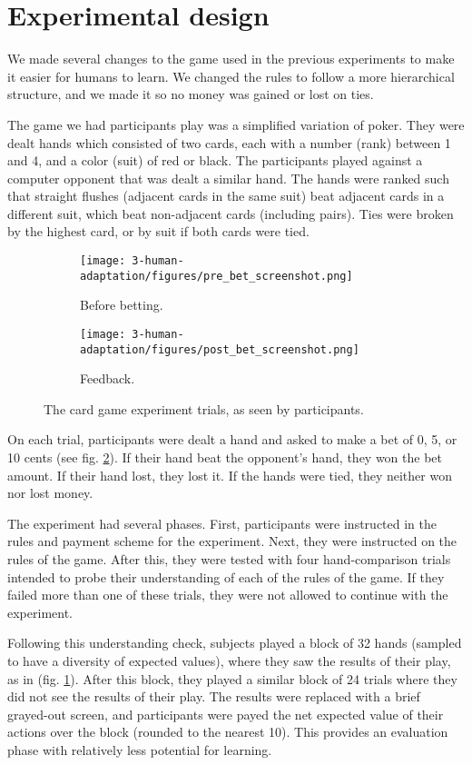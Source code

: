 \section{Experimental design}
We made several changes to the game used in the previous experiments to make it easier for humans to learn. We changed the rules to follow a more hierarchical structure, and we made it so no money was gained or lost on ties. \par
The game we had participants play was a simplified variation of poker. They were dealt hands which consisted of two cards, each with a number (rank) between 1 and 4, and a color (suit) of red or black. The participants played against a computer opponent that was dealt a similar hand. The hands were ranked such that straight flushes (adjacent cards in the same suit) beat adjacent cards in a different suit, which beat non-adjacent cards (including pairs). Ties were broken by the highest card, or by suit if both cards were tied. \par
\begin{figure}
\centering
\begin{subfigure}[b]{0.5\textwidth}
\texttt{[image: 3-human-adaptation/figures/pre\_bet\_screenshot.png]}
\caption{Before betting.}
\end{subfigure}%
\begin{subfigure}[b]{0.5\textwidth}
\texttt{[image: 3-human-adaptation/figures/post\_bet\_screenshot.png]}
\caption{Feedback.} \label{fig:human_betting_trial_feedback}
\end{subfigure}%
\caption{The card game experiment trials, as seen by participants.} \label{fig:human_betting_trial}
\end{figure}
On each trial, participants were dealt a hand and asked to make a bet of 0, 5, or 10 cents (see fig. \ref{fig:human_betting_trial}). If their hand beat the opponent's hand, they won the bet amount. If their hand lost, they lost it. If the hands were tied, they neither won nor lost money. \par
The experiment had several phases. First, participants were instructed in the rules and payment scheme for the experiment. Next, they were instructed on the rules of the game. After this, they were tested with four hand-comparison trials intended to probe their understanding of each of the rules of the game. If they failed more than one of these trials, they were not allowed to continue with the experiment. \par
Following this understanding check, subjects played a block of 32 hands (sampled to have a diversity of expected values), where they saw the results of their play, as in (fig. \ref{fig:human_betting_trial_feedback}). After this block, they played a similar block of 24 trials where they did not see the results of their play. The results were replaced with a brief grayed-out screen, and participants were payed the net expected value of their actions over the block (rounded to the nearest 10). This provides an evaluation phase with relatively less potential for learning. \par
